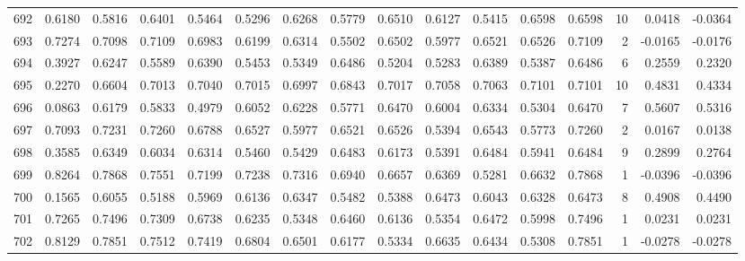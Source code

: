 \begin{tabular}{lrrrrrrrrrrrrrrr}
692 &      0.6180 &  0.5816 &  0.6401 &  0.5464 &  0.5296 &  0.6268 &  0.5779 &  0.6510 &  0.6127 &  0.5415 &   0.6598 &     0.6598 &     10 &                    0.0418 &                    -0.0364 \\
693 &      0.7274 &  0.7098 &  0.7109 &  0.6983 &  0.6199 &  0.6314 &  0.5502 &  0.6502 &  0.5977 &  0.6521 &   0.6526 &     0.7109 &      2 &                   -0.0165 &                    -0.0176 \\
694 &      0.3927 &  0.6247 &  0.5589 &  0.6390 &  0.5453 &  0.5349 &  0.6486 &  0.5204 &  0.5283 &  0.6389 &   0.5387 &     0.6486 &      6 &                    0.2559 &                     0.2320 \\
695 &      0.2270 &  0.6604 &  0.7013 &  0.7040 &  0.7015 &  0.6997 &  0.6843 &  0.7017 &  0.7058 &  0.7063 &   0.7101 &     0.7101 &     10 &                    0.4831 &                     0.4334 \\
696 &      0.0863 &  0.6179 &  0.5833 &  0.4979 &  0.6052 &  0.6228 &  0.5771 &  0.6470 &  0.6004 &  0.6334 &   0.5304 &     0.6470 &      7 &                    0.5607 &                     0.5316 \\
697 &      0.7093 &  0.7231 &  0.7260 &  0.6788 &  0.6527 &  0.5977 &  0.6521 &  0.6526 &  0.5394 &  0.6543 &   0.5773 &     0.7260 &      2 &                    0.0167 &                     0.0138 \\
698 &      0.3585 &  0.6349 &  0.6034 &  0.6314 &  0.5460 &  0.5429 &  0.6483 &  0.6173 &  0.5391 &  0.6484 &   0.5941 &     0.6484 &      9 &                    0.2899 &                     0.2764 \\
699 &      0.8264 &  0.7868 &  0.7551 &  0.7199 &  0.7238 &  0.7316 &  0.6940 &  0.6657 &  0.6369 &  0.5281 &   0.6632 &     0.7868 &      1 &                   -0.0396 &                    -0.0396 \\
700 &      0.1565 &  0.6055 &  0.5188 &  0.5969 &  0.6136 &  0.6347 &  0.5482 &  0.5388 &  0.6473 &  0.6043 &   0.6328 &     0.6473 &      8 &                    0.4908 &                     0.4490 \\
701 &      0.7265 &  0.7496 &  0.7309 &  0.6738 &  0.6235 &  0.5348 &  0.6460 &  0.6136 &  0.5354 &  0.6472 &   0.5998 &     0.7496 &      1 &                    0.0231 &                     0.0231 \\
702 &      0.8129 &  0.7851 &  0.7512 &  0.7419 &  0.6804 &  0.6501 &  0.6177 &  0.5334 &  0.6635 &  0.6434 &   0.5308 &     0.7851 &      1 &                   -0.0278 &                    -0.0278 \\

\end{tabular}

